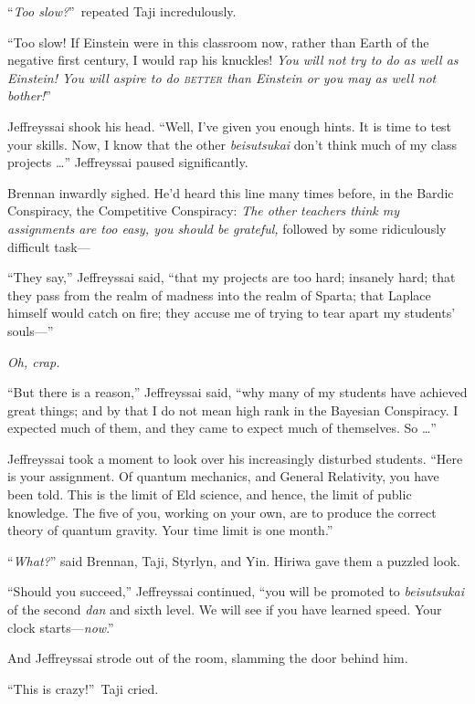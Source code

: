 {
 ``\textit{Too slow?}''~repeated
Taji incredulously.}

{
 ``Too slow! If Einstein were in this classroom
now, rather than Earth of the negative first century, I would rap his
knuckles! \textit{You will not try to do as well as Einstein! You will
aspire to do \textsc{better} than Einstein or you may as well not
bother!}''}

{
 Jeffreyssai shook his head. ``Well,
I've given you enough hints. It is time to test your
skills. Now, I know that the other \textit{beisutsukai}
don't think much of my class projects
\ldots'' Jeffreyssai paused significantly.}

{
 Brennan inwardly sighed. He'd heard this line many
times before, in the Bardic Conspiracy, the Competitive Conspiracy:
\textit{The other teachers think my assignments are too easy, you
should be grateful,} followed by some ridiculously difficult task---}

{
 ``They say,'' Jeffreyssai said,
``that my projects are too hard; insanely hard; that
they pass from the realm of madness into the realm of Sparta; that
Laplace himself would catch on fire; they accuse me of trying to tear
apart my students' souls---''}

{
 \textit{Oh, crap.}}

{
 ``But there is a reason,''
Jeffreyssai said, ``why many of my students have
achieved great things; and by that I do not mean high rank in the
Bayesian Conspiracy. I expected much of them, and they came to expect
much of themselves. So \ldots''}

{
 Jeffreyssai took a moment to look over his increasingly disturbed
students. ``Here is your assignment. Of quantum
mechanics, and General Relativity, you have been told. This is the
limit of Eld science, and hence, the limit of public knowledge. The
five of you, working on your own, are to produce the correct theory of
quantum gravity. Your time limit is one month.''}

{
 ``\textit{What?}'' said
Brennan, Taji, Styrlyn, and Yin. Hiriwa gave them a puzzled look.}

{
 ``Should you succeed,''
Jeffreyssai continued, ``you will be promoted to
\textit{beisutsukai} of the second \textit{dan} and sixth level. We
will see if you have learned speed. Your clock
starts---\textit{now}.''}

{
 And Jeffreyssai strode out of the room, slamming the door behind
him.}

{
 ``This is crazy!''~Taji cried.}


